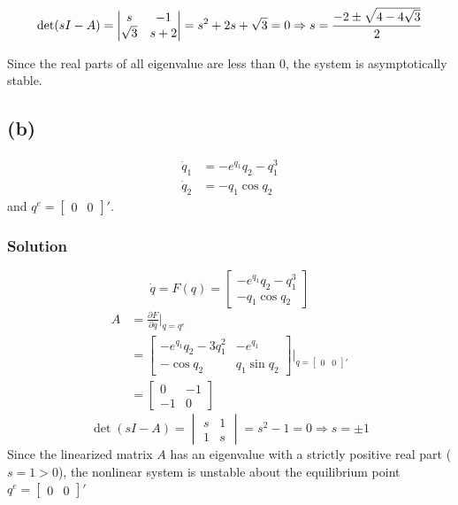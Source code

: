 \documentclass[12pt,a4paper]{article}
\begin{document}
	\[
	\det (sI - A) = \begin{vmatrix}
		s & -1 \\ \sqrt 3 & s + 2
	\end{vmatrix} = s^2 + 2s + \sqrt3 = 0 \Rightarrow  s = { -2 \pm \sqrt{4- 4\sqrt3} \over 2}
	\]
	
	Since the real parts of all eigenvalue are less than 0, the system is asymptotically stable.
	
		
	\subsection*{(b)}
	\begin{align*}
		\dot{q}_{1} &= -e^{q_{1}}q_{2}-q_{1}^{3} \\
		\dot{q}_{2} &= -q_{1}\cos q_{2}
	\end{align*}
	and $q^{e}=\begin{bmatrix} 0 & 0 \end{bmatrix}'$.
	\subsubsection*{Solution}
	
	\[
	\dot{q} = F(q) = \begin{bmatrix}
		-e^{q_1}q_2 - q_1^3 \\
		-q_1\cos q_2
	\end{bmatrix}
	\]
	\begin{align*}
		A &= \frac{\partial F}{\partial q}\bigg|_{q = q^e} \\
		&= \begin{bmatrix}
			-e^{q_1}q_2 - 3q_1^2 & -e^{q_1} \\
			-\cos q_2 & q_1\sin q_2
		\end{bmatrix}\bigg|_{q = \begin{bmatrix} 0 & 0 \end{bmatrix}'} \\
		&= \begin{bmatrix}
			0 & -1 \\
			-1 & 0
		\end{bmatrix}
	\end{align*}
	\[
	\det(sI - A) = \begin{vmatrix}
		s & 1 \\
		1 & s
	\end{vmatrix} = s^2 - 1 = 0 \Rightarrow s = \pm 1
	\]
	Since the linearized matrix $A$ has an eigenvalue with a strictly positive real part ($s = 1 > 0$), the nonlinear system is unstable about the equilibrium point $q^e = \begin{bmatrix} 0 & 0 \end{bmatrix}'$
\end{document}
